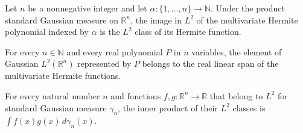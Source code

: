 \begin{lemma}
\label{BooleanAnalysis.GaussianSpace.gaussianPolynomialLp_hermite}
\leanok
{}
Let $n$ be a nonnegative integer and let $\alpha:\{1,\ldots,n\}\to\mathbb N$. Under the
product standard Gaussian measure on $\mathbb R^n$, the image in $L^2$ of the
multivariate Hermite polynomial indexed by $\alpha$ is the $L^2$ class of its Hermite
function.
\end{lemma}

\begin{lemma}
\label{BooleanAnalysis.GaussianSpace.gaussianPolynomialLp_mem_span_hermiteL2}
\leanok
{}
For every $n\in\mathbb N$ and every real polynomial $P$ in $n$ variables, the element of
Gaussian $L^2(\mathbb R^n)$ represented by $P$ belongs to the real linear span of the
multivariate Hermite functions.
\end{lemma}

\begin{lemma}
\label{BooleanAnalysis.GaussianSpace.inner_toLp_eq_integral_mul}
\leanok
{}
For every natural number $n$ and functions $f,g:\mathbb R^n\to\mathbb R$ that belong to
$L^2$ for standard Gaussian measure $\gamma_n$, the inner product of their $L^2$ classes
is $\int f(x)g(x)\,d\gamma_n(x)$.
\end{lemma}

